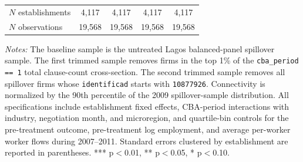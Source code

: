 \begin{table}[!htbp]
\begin{tabular}{lcccc}
$N$ establishments & 4{,}117 & 4{,}117 & 4{,}117 & 4{,}117\\
$N$ observations & 19{,}568 & 19{,}568 & 19{,}568 & 19{,}568\\
\bottomrule
\end{tabular}
\begin{minipage}{\linewidth}
\footnotesize\vspace{4pt}
\textit{Notes:} The baseline sample is the untreated Lagos balanced-panel spillover sample. The first trimmed sample removes firms in the top 1\% of the \texttt{cba\_period == 1} total clause-count cross-section. The second trimmed sample removes all spillover firms whose \texttt{identificad} starts with \texttt{10877926}. Connectivity is normalized by the 90th percentile of the 2009 spillover-sample distribution. All specifications include establishment fixed effects, CBA-period interactions with industry, negotiation month, and microregion, and quartile-bin controls for the pre-treatment outcome, pre-treatment log employment, and average per-worker worker flows during 2007--2011. Standard errors clustered by establishment are reported in parentheses. *** p$<$0.01, ** p$<$0.05, * p$<$0.10.
\end{minipage}
\end{table}
